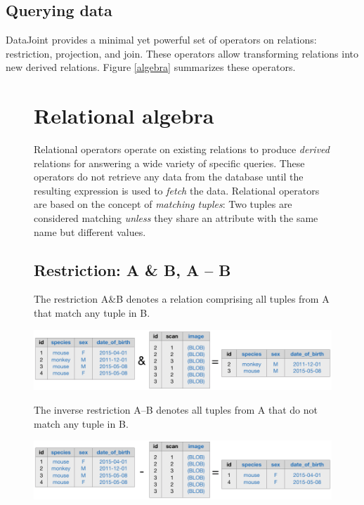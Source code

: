 \documentclass[10pt,letterpaper]{article}
\begin{document}
\subsection*{Querying data}
DataJoint provides a minimal yet powerful set of operators on relations: restriction, projection, and join.
These operators allow transforming relations into new derived relations. 
Figure \ref{algebra} summarizes these operators.
\begin{figure}
\begin{adjustwidth}{-2.25in}{0in}
\begin{boxedminipage}{\linewidth}
\section*{Relational algebra}

Relational operators operate on existing relations to produce \emph{derived} relations for answering a wide variety of specific queries.
These operators do not retrieve any data from the database until the resulting expression is used to \emph{fetch} the data.
Relational operators are based on the concept of \emph{matching tuples}: 
Two tuples are considered matching  \emph{unless} they share an attribute with the same name but different values.

\subsection*{Restriction:  {\sf A \& B}, {\sf A -- B}}
The restriction A\&B denotes a relation comprising all tuples from A that match any tuple in {\sf B}.  

\begin{center}
\includegraphics{./figures/restriction.pdf}
\end{center}

The inverse restriction {\sf A--B} denotes all tuples from {\sf A} that do not match any tuple in {\sf B}.

\begin{center}
\includegraphics{./figures/antijoin.pdf}
\end{center}



\end{boxedminipage}
\end{adjustwidth}
\end{figure}
\end{document}
